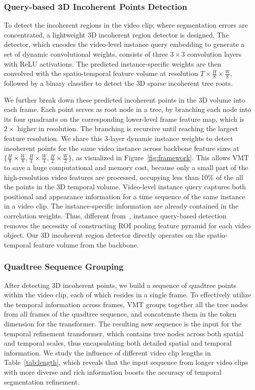 \documentclass[runningheads]{llncs}
\begin{document}
\subsubsection{Query-based 3D Incoherent Points Detection} To detect the incoherent regions in the video clip, where segmentation errors are concentrated, a lightweight 3D incoherent region detector is designed. The detector, which encodes the video-level instance query embedding to generate a set of dynamic convolutional weights, consists of  three $3\times3$ convolution layers with ReLU activations. The predicted instance-specific weights are then convolved with the spatio-temporal feature volume at resolution $T\times\frac{H}{8}\times\frac{W}{8}$, followed by a binary classifier to detect the 3D sparse incoherent tree roots. 


We further break down these predicted incoherent points in the 3D volume into each frame. Each point serves as root node in a tree, by branching each node into its four quadrants on the corresponding lower-level frame feature map, which is $2\times$ higher in resolution. The branching is recursive until reaching the largest feature resolution.
We share this 3-layer dynamic instance weights to detect incoherent points for the same video instance across backbone feature sizes at $\{\frac{H}{8}\times\frac{W}{8}, \frac{H}{4}\times\frac{W}{4}, \frac{H}{2}\times\frac{W}{2}\}$, as visualized in Figure~\ref{fig:framework}.
This allows VMT to save a huge computational and memory cost, because only a small part of the high-resolution video features are processed, occupying less than 10\% of the all the points in the 3D temporal volume. 
Video-level instance query captures both positional and appearance information for a time sequence of the same instance in a video clip.
The instance-specific information are already contained in the correlation weights.
Thus, different from~\cite{transfiner}, instance query-based detection removes the necessity of constructing ROI pooling feature pyramid for each video object.
Our 3D incoherent region detector directly operates on the spatio-temporal feature volume from the backbone.

\label{sec:incoherent}

\subsubsection{Quadtree Sequence Grouping}
After detecting 3D incoherent points, we build a sequence of quadtree points within the video clip, each of which resides in a single frame.
To effectively utilize the temporal information across frames, VMT groups together all the tree nodes from all frames of the quadtree sequence, and concatenate them in the token dimension for the transformer. 
The resulting new sequence is the input for the temporal refinement transformer, which contains tree nodes across both spatial and temporal scales, thus encapsulating both detailed spatial and temporal information. We study the influence of different video clip lengths in Table~\ref{tab:length}, which reveals that the input sequence from longer video clips with more diverse and rich information  boosts the accuracy of temporal segmentation refinement.
\end{document}
